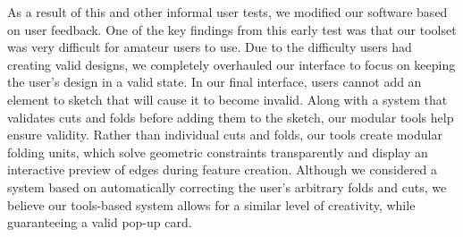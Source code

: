 As a result of this and other informal user tests, we modified our
software based on user feedback. One of the key findings from this early
test was that our toolset was very difficult for amateur users to use.
Due to the difficulty users had creating valid designs, we completely
overhauled our interface to focus on keeping the user's design in a
valid state. In our final interface, users cannot add an element to
sketch that will cause it to become invalid. Along with a system that
validates cuts and folds before adding them to the sketch, our modular
tools help ensure validity. Rather than individual cuts and folds, our
tools create modular folding units, which solve geometric constraints
transparently and display an interactive preview of edges during feature
creation. Although we considered a system based on automatically
correcting the user's arbitrary folds and cuts, we believe our
tools-based system allows for a similar level of creativity, while
guaranteeing a valid pop-up card.
